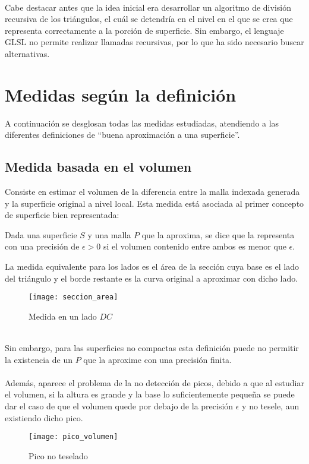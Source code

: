 \\ Cabe destacar antes que la idea inicial era desarrollar un algoritmo de división recursiva de los triángulos, el cuál se detendría en el nivel en el que se crea que representa correctamente a la porción de superficie. Sin embargo, el lenguaje GLSL no permite realizar llamadas recursivas, por lo que ha sido necesario buscar alternativas.\\


\section{Medidas según la definición}

	A continuación se desglosan todas las medidas estudiadas, atendiendo a las diferentes definiciones de ``buena aproximación a una superficie''.

	\subsection*{Medida basada en el volumen}
	
	Consiste en estimar el volumen de la diferencia entre la malla indexada generada y la superficie original a nivel local. Esta medida está asociada al primer concepto de superficie bien representada:
	\begin{definicion}
		Dada una superficie $S$ y una malla $P$ que la aproxima, se dice que la representa con una precisión de $\epsilon > 0$ si el volumen contenido entre ambos es menor que $\epsilon$.
	\end{definicion}
	La medida equivalente para los lados es el área de la sección cuya base es el lado del triángulo y el borde restante es la curva original a aproximar con dicho lado.\\ 
	\begin{figure}[h]
  		\centering
  		\texttt{[image: seccion\_area]}
  		\caption{Medida en un lado $DC$}
  		\label{fig:seccion_area}
	\end{figure}
	\\ Sin embargo, para las superficies no compactas esta definición puede no permitir la existencia de un $P$ que la aproxime con una precisión finita.\\
	\\ Además, aparece el problema de la no detección de picos, debido a que al estudiar el volumen, si la altura es grande y la base lo suficientemente pequeña se puede dar el caso de que el volumen quede por debajo de la precisión $\epsilon$ y no tesele, aun existiendo dicho pico.
	\begin{figure}[h]
  		\centering
  		\texttt{[image: pico\_volumen]}
  		\caption{Pico no teselado}
  		\label{fig:pico_volumen}
	\end{figure}

